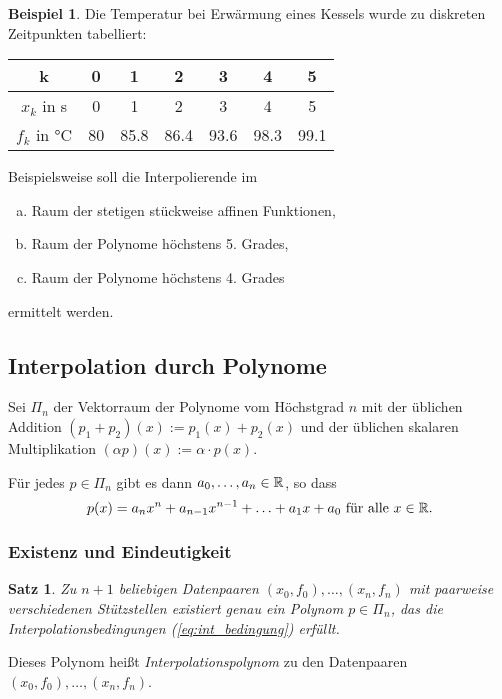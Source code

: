 \documentclass[
 a4paper,
 12pt,
 parskip=half
 ]{scrartcl}
\numberwithin{equation}{section}
\theoremstyle{plain}
\newtheorem{thm}{Satz}[section] %
\theoremstyle{definition}
\newtheorem{exmp}{Beispiel}[section] %
\numberwithin{equation}{section}
\begin{document}
\begin{exmp}
 Die Temperatur bei Erwärmung eines Kessels wurde zu diskreten Zeitpunkten tabelliert:
 
 \begin{center}
 \begin{tabular}{c|cccccc}
  k & 0 & 1 & 2 & 3 & 4 & 5\\
  \hline
  $x_k$ in \si{\s} & 0 & 1 & 2 & 3 & 4 & 5\\
  $f_k$ in \si{\celsius} & 80 & 85.8 & 86.4 & 93.6 & 98.3 & 99.1
 \end{tabular}
 \end{center}

 Beispielsweise soll die Interpolierende im
 \begin{enumerate}[a)]
  \item Raum der stetigen stückweise affinen Funktionen,
  \item Raum der Polynome höchstens 5. Grades,
  \item Raum der Polynome höchstens 4. Grades
 \end{enumerate}
 ermittelt werden.
\end{exmp}

\subsection{Interpolation durch Polynome}
Sei $\Pi_n$ der Vektorraum der Polynome vom Höchstgrad $n$ mit der üblichen Addition $(p_1+p_2)(x) := p_1(x) + p_2(x)$ und der üblichen skalaren Multiplikation $(\alpha p)(x) := \alpha \cdot p(x)$.

Für jedes $p \in \Pi_n$ gibt es dann $a_0, \ldots, a_n \in \mathbb{R}$, so dass 
\begin{equation} p(x) = a_n x^n + a_{n-1} x^{n-1} + \ldots + a_1 x + a_0 \text{ für alle } x \in \mathbb{R}. \end{equation}

\subsubsection{Existenz und Eindeutigkeit}
\begin{thm}
 Zu $n+1$ beliebigen Datenpaaren $(x_0, f_0), \ldots, (x_n, f_n)$ mit paarweise verschiedenen Stützstellen existiert genau ein Polynom $p \in \Pi_n$, das die Interpolationsbedingungen (\ref{eq:int_bedingung}) erfüllt.
\end{thm}

Dieses Polynom heißt \emph{Interpolationspolynom} zu den Datenpaaren $(x_0, f_0), \ldots, (x_n, f_n)$.
\end{document}
